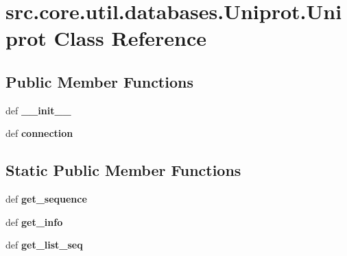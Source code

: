 \hypertarget{classsrc_1_1core_1_1util_1_1databases_1_1Uniprot_1_1Uniprot}{\section{src.\-core.\-util.\-databases.\-Uniprot.\-Uniprot Class Reference}
\label{classsrc_1_1core_1_1util_1_1databases_1_1Uniprot_1_1Uniprot}
}
\subsection*{Public Member Functions}
\begin{DoxyCompactItemize}
\item 
\hypertarget{classsrc_1_1core_1_1util_1_1databases_1_1Uniprot_1_1Uniprot_a77fd8e43529ac54ba6a7ff86cf0b0783}{def {\bfseries \-\_\-\-\_\-init\-\_\-\-\_\-}}\label{classsrc_1_1core_1_1util_1_1databases_1_1Uniprot_1_1Uniprot_a77fd8e43529ac54ba6a7ff86cf0b0783}

\item 
\hypertarget{classsrc_1_1core_1_1util_1_1databases_1_1Uniprot_1_1Uniprot_a82b2e4d34870c519f7185c4f986684f6}{def {\bfseries connection}}\label{classsrc_1_1core_1_1util_1_1databases_1_1Uniprot_1_1Uniprot_a82b2e4d34870c519f7185c4f986684f6}

\end{DoxyCompactItemize}
\subsection*{Static Public Member Functions}
\begin{DoxyCompactItemize}
\item 
\hypertarget{classsrc_1_1core_1_1util_1_1databases_1_1Uniprot_1_1Uniprot_ac7d83000275bfbba6f739b9525dd9dfa}{def {\bfseries get\-\_\-sequence}}\label{classsrc_1_1core_1_1util_1_1databases_1_1Uniprot_1_1Uniprot_ac7d83000275bfbba6f739b9525dd9dfa}

\item 
\hypertarget{classsrc_1_1core_1_1util_1_1databases_1_1Uniprot_1_1Uniprot_a0299cea0c35124dcfd5adb54be364809}{def {\bfseries get\-\_\-info}}\label{classsrc_1_1core_1_1util_1_1databases_1_1Uniprot_1_1Uniprot_a0299cea0c35124dcfd5adb54be364809}

\item 
\hypertarget{classsrc_1_1core_1_1util_1_1databases_1_1Uniprot_1_1Uniprot_ab69e8eeae2320c7ef5d71bf2adeef910}{def {\bfseries get\-\_\-list\-\_\-seq}}\label{classsrc_1_1core_1_1util_1_1databases_1_1Uniprot_1_1Uniprot_ab69e8eeae2320c7ef5d71bf2adeef910}

\end{DoxyCompactItemize}
